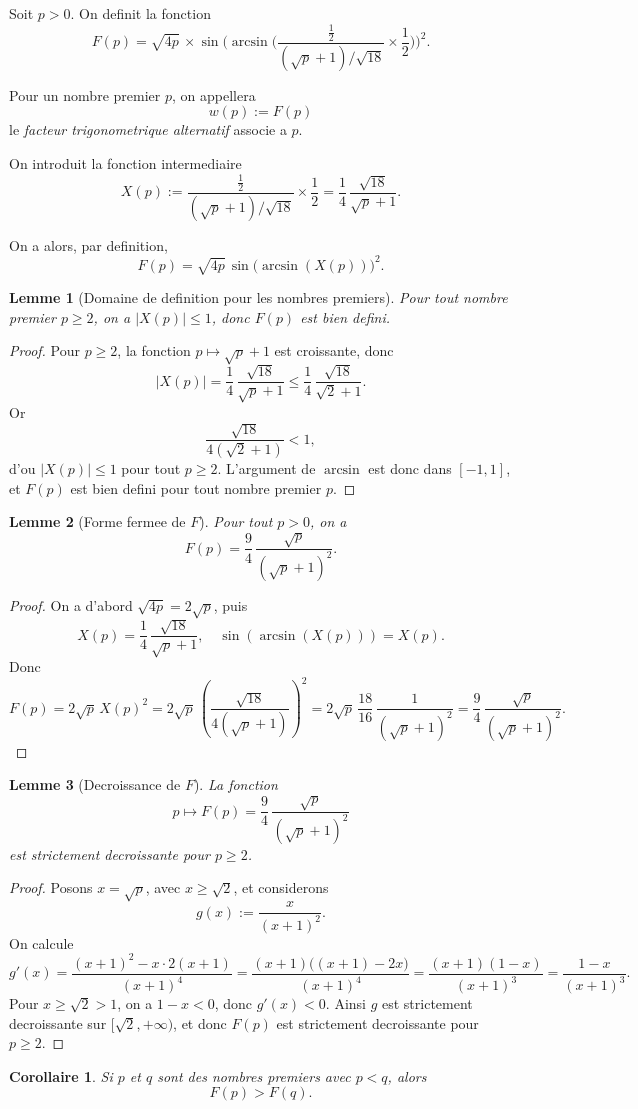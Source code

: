 \documentclass[12pt,a4paper]{article}
\newtheorem{lemma}{Lemme}
\newtheorem{corollary}{Corollaire}
\theoremstyle{definition}
\theoremstyle{remark}
\begin{document}
Soit $p > 0$. On definit la fonction
\[
F(p)
= \sqrt{4p}\,\times
  \sin\!\Biggl(
    \arcsin\Biggl(
      \frac{\tfrac{1}{2}}{(\sqrt{p}+1)/\sqrt{18}} \times \frac{1}{2}
    \Biggr)
  \Biggr)^{2}.
\]

Pour un nombre premier $p$, on appellera
\[
w(p) := F(p)
\]
le \emph{facteur trigonometrique alternatif} associe a $p$.

On introduit la fonction intermediaire
\[
X(p)
:= \frac{\tfrac{1}{2}}{(\sqrt{p}+1)/\sqrt{18}} \times \frac{1}{2}
= \frac{1}{4}\,\frac{\sqrt{18}}{\sqrt{p}+1}.
\]

On a alors, par definition,
\[
F(p) = \sqrt{4p}\,\sin\bigl(\arcsin(X(p))\bigr)^{2}.
\]

\begin{lemma}[Domaine de definition pour les nombres premiers]
Pour tout nombre premier $p \ge 2$, on a $|X(p)| \le 1$, donc $F(p)$ est bien defini.
\end{lemma}

\begin{proof}
Pour $p \ge 2$, la fonction $p \mapsto \sqrt{p}+1$ est croissante, donc
\[
|X(p)|
= \frac{1}{4}\,\frac{\sqrt{18}}{\sqrt{p}+1}
\le \frac{1}{4}\,\frac{\sqrt{18}}{\sqrt{2}+1}.
\]
Or
\[
\frac{\sqrt{18}}{4(\sqrt{2}+1)} < 1,
\]
d'ou $|X(p)| \le 1$ pour tout $p \ge 2$. L'argument de $\arcsin$ est donc dans $[-1,1]$, et $F(p)$ est bien defini pour tout nombre premier $p$.
\end{proof}

\begin{lemma}[Forme fermee de $F$]
Pour tout $p > 0$, on a
\[
F(p)
= \frac{9}{4}\,\frac{\sqrt{p}}{(\sqrt{p}+1)^{2}}.
\]
\end{lemma}

\begin{proof}
On a d'abord $\sqrt{4p} = 2\sqrt{p}$, puis
\[
X(p)
= \frac{1}{4}\,\frac{\sqrt{18}}{\sqrt{p}+1},
\quad
\sin(\arcsin(X(p))) = X(p).
\]
Donc
\[
F(p)
= 2\sqrt{p}\,X(p)^{2}
= 2\sqrt{p}\,\left(\frac{\sqrt{18}}{4(\sqrt{p}+1)}\right)^{2}
= 2\sqrt{p}\,\frac{18}{16}\,\frac{1}{(\sqrt{p}+1)^{2}}
= \frac{9}{4}\,\frac{\sqrt{p}}{(\sqrt{p}+1)^{2}}.
\]
\end{proof}

\begin{lemma}[Decroissance de $F$]
La fonction
\[
p \mapsto F(p) = \frac{9}{4}\,\frac{\sqrt{p}}{(\sqrt{p}+1)^{2}}
\]
est strictement decroissante pour $p \ge 2$.
\end{lemma}

\begin{proof}
Posons $x = \sqrt{p}$, avec $x \ge \sqrt{2}$, et considerons
\[
g(x) := \frac{x}{(x+1)^{2}}.
\]
On calcule
\[
g'(x)
= \frac{(x+1)^{2} - x \cdot 2(x+1)}{(x+1)^{4}}
= \frac{(x+1)\bigl((x+1) - 2x\bigr)}{(x+1)^{4}}
= \frac{(x+1)(1 - x)}{(x+1)^{3}}
= \frac{1 - x}{(x+1)^{3}}.
\]
Pour $x \ge \sqrt{2} > 1$, on a $1 - x < 0$, donc $g'(x) < 0$. Ainsi $g$ est strictement decroissante sur $[\sqrt{2},+\infty)$, et donc $F(p)$ est strictement decroissante pour $p \ge 2$.
\end{proof}
\begin{corollary}
Si $p$ et $q$ sont des nombres premiers avec $p < q$, alors
\[
F(p) > F(q).
\]
\end{corollary}
\end{document}
